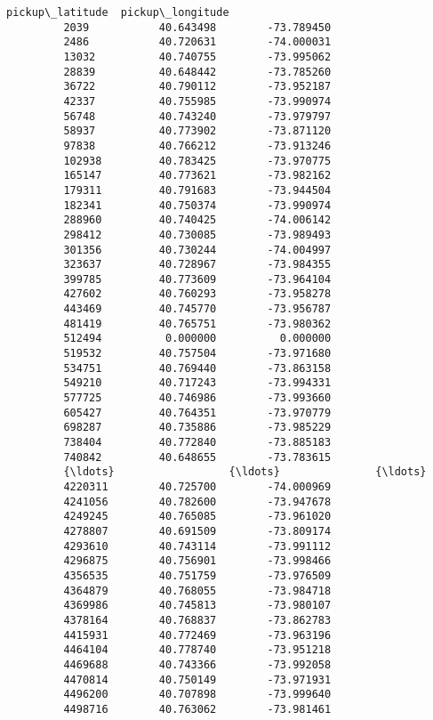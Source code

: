 \documentclass[11pt]{article}
\begin{document}
\begin{Verbatim}[commandchars=\\\{\}]
                  pickup\_latitude  pickup\_longitude  
         2039           40.643498        -73.789450  
         2486           40.720631        -74.000031  
         13032          40.740755        -73.995062  
         28839          40.648442        -73.785260  
         36722          40.790112        -73.952187  
         42337          40.755985        -73.990974  
         56748          40.743240        -73.979797  
         58937          40.773902        -73.871120  
         97838          40.766212        -73.913246  
         102938         40.783425        -73.970775  
         165147         40.773621        -73.982162  
         179311         40.791683        -73.944504  
         182341         40.750374        -73.990974  
         288960         40.740425        -74.006142  
         298412         40.730085        -73.989493  
         301356         40.730244        -74.004997  
         323637         40.728967        -73.984355  
         399785         40.773609        -73.964104  
         427602         40.760293        -73.958278  
         443469         40.745770        -73.956787  
         481419         40.765751        -73.980362  
         512494          0.000000          0.000000  
         519532         40.757504        -73.971680  
         534751         40.769440        -73.863158  
         549210         40.717243        -73.994331  
         577725         40.746986        -73.993660  
         605427         40.764351        -73.970779  
         698287         40.735886        -73.985229  
         738404         40.772840        -73.885183  
         740842         40.648655        -73.783615  
         {\ldots}                  {\ldots}               {\ldots}  
         4220311        40.725700        -74.000969  
         4241056        40.782600        -73.947678  
         4249245        40.765085        -73.961020  
         4278807        40.691509        -73.809174  
         4293610        40.743114        -73.991112  
         4296875        40.756901        -73.998466  
         4356535        40.751759        -73.976509  
         4364879        40.768055        -73.984718  
         4369986        40.745813        -73.980107  
         4378164        40.768837        -73.862783  
         4415931        40.772469        -73.963196  
         4464104        40.778740        -73.951218  
         4469688        40.743366        -73.992058  
         4470814        40.750149        -73.971931  
         4496200        40.707898        -73.999640  
         4498716        40.763062        -73.981461  

\end{Verbatim}
\end{document}
